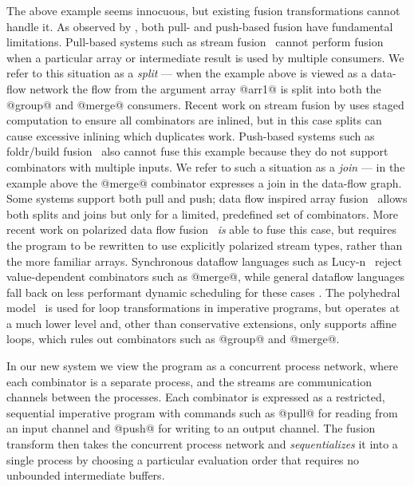 The above example seems innocuous, but existing fusion transformations cannot handle it.
As observed by \citet{kay2009you}, both pull- and push-based fusion have fundamental limitations.
Pull-based systems such as stream fusion~\cite{coutts2007stream} cannot perform fusion when a particular array or intermediate result is used by multiple consumers.
We refer to this situation as a \emph{split} --- when the example above is viewed as a data-flow network the flow from the argument array @arr1@ is split into both the @group@ and @merge@ consumers.
Recent work on stream fusion by \citet{kiselyov2016stream} uses staged computation to ensure all combinators are inlined, but in this case splits can cause excessive inlining which duplicates work.
Push-based systems such as foldr/build fusion~\cite{gill1993short} also cannot fuse this example because they do not support combinators with multiple inputs.
We refer to such a situation as a \emph{join} --- in the example above the @merge@ combinator expresses a join in the data-flow graph.
Some systems support both pull and push; data flow inspired array fusion~\cite{lippmeier2013data} allows both splits and joins but only for a limited, predefined set of combinators.
More recent work on polarized data flow fusion~\cite{lippmeier2016polarized} \emph{is} able to fuse this case, but requires the program to be rewritten to use explicitly polarized stream types, rather than the more familiar arrays.
Synchronous dataflow languages such as Lucy-n~\cite{mandel2010lucy} reject value-dependent combinators such as @merge@, while general dataflow languages fall back on less performant dynamic scheduling for these cases \cite{bouakaz2013real}.
The polyhedral model~\cite{feautrier2011polyhedron} is used for loop transformations in imperative programs, but operates at a much lower level and, other than conservative extensions, only supports affine loops, which rules out combinators such as @group@ and @merge@.

In our new system we view the program as a concurrent process network, where each combinator is a separate process, and the streams are communication channels between the processes. Each combinator is expressed as a restricted, sequential imperative program with commands such as @pull@ for reading from an input channel and @push@ for writing to an output channel. The fusion transform then takes the concurrent process network and \emph{sequentializes} it into a single process by choosing a particular evaluation order that requires no unbounded intermediate buffers. 

